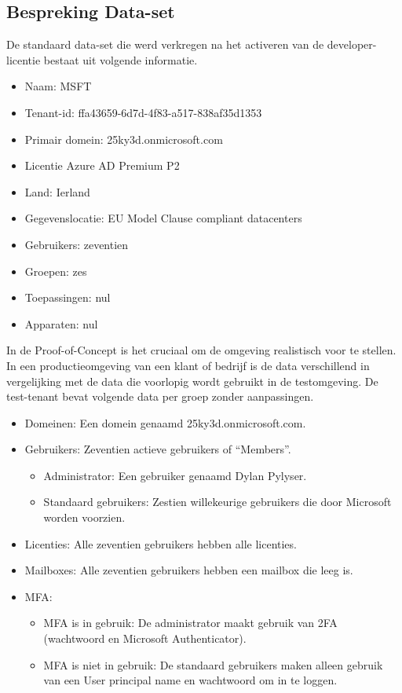 \subsection{Bespreking Data-set}

De standaard data-set die werd verkregen na het activeren van de developer-licentie bestaat uit volgende informatie.

\begin{itemize}
    \item Naam: MSFT
    \item Tenant-id: ffa43659-6d7d-4f83-a517-838af35d1353
    \item Primair domein: 25ky3d.onmicrosoft.com
    \item Licentie Azure AD Premium P2
    \item Land: Ierland
    \item Gegevenslocatie: EU Model Clause compliant datacenters
    \item Gebruikers: zeventien
    \item Groepen: zes
    \item Toepassingen: nul
    \item Apparaten: nul
\end{itemize}

In de Proof-of-Concept is het cruciaal om de omgeving realistisch voor te stellen. In een productieomgeving van een klant of bedrijf is de data verschillend in vergelijking met de data die voorlopig wordt gebruikt in de testomgeving. De test-tenant bevat volgende data per groep zonder aanpassingen.

\begin{itemize}
    \item Domeinen: Een domein genaamd 25ky3d.onmicrosoft.com.
    \item Gebruikers: Zeventien actieve gebruikers of “Members”.
    \begin{itemize}
        \item Administrator: Een gebruiker genaamd Dylan Pylyser.
        \item Standaard gebruikers: Zestien willekeurige gebruikers die door Microsoft worden voorzien.
    \end{itemize}
    \item Licenties: Alle zeventien gebruikers hebben alle licenties.
    \item Mailboxes: Alle zeventien gebruikers hebben een mailbox die leeg is.
    \item \Ac{MFA}: 
        \begin{itemize}
            \item \ac{MFA} is in gebruik: De administrator maakt gebruik van \ac{2FA} (wachtwoord en Microsoft Authenticator).
            \item \Ac{MFA} is niet in gebruik: De standaard gebruikers maken alleen gebruik van een User principal name en wachtwoord om in te loggen.
        \end{itemize}
\end{itemize}

